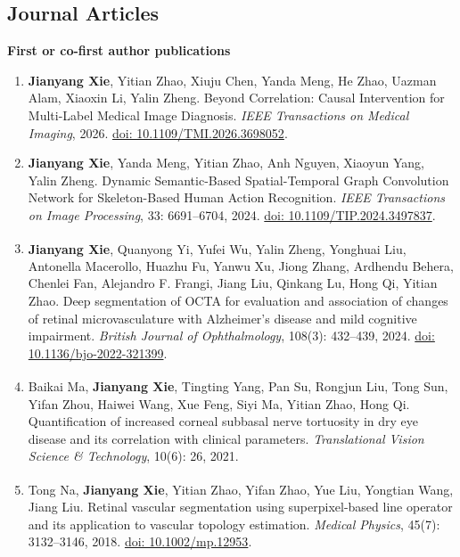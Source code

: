 \documentclass[11pt,a4paper]{article}
\begin{document}
\subsection*{Journal Articles}
\textbf{First or co-first author publications}\par
\begin{enumerate}[label={\textcolor{accent}{\sffamily\footnotesize J\arabic*}},leftmargin=2.5em,itemsep=8pt,parsep=0pt]
\item \textbf{Jianyang Xie}, Yitian Zhao, Xiuju Chen, Yanda Meng, He Zhao, Uazman Alam, Xiaoxin Li, Yalin Zheng. Beyond Correlation: Causal Intervention for Multi-Label Medical Image Diagnosis. \textit{IEEE Transactions on Medical Imaging}, 2026. \href{https://doi.org/10.1109/TMI.2026.3698052}{doi: 10.1109/TMI.2026.3698052}.
\item \textbf{Jianyang Xie}, Yanda Meng, Yitian Zhao, Anh Nguyen, Xiaoyun Yang, Yalin Zheng. Dynamic Semantic-Based Spatial-Temporal Graph Convolution Network for Skeleton-Based Human Action Recognition. \textit{IEEE Transactions on Image Processing}, 33: 6691--6704, 2024. \href{https://doi.org/10.1109/TIP.2024.3497837}{doi: 10.1109/TIP.2024.3497837}.
\item \textbf{Jianyang Xie}\textsuperscript{\dag}, Quanyong Yi\textsuperscript{\dag}, Yufei Wu\textsuperscript{\dag}, Yalin Zheng, Yonghuai Liu, Antonella Macerollo, Huazhu Fu, Yanwu Xu, Jiong Zhang, Ardhendu Behera, Chenlei Fan, Alejandro F. Frangi, Jiang Liu, Qinkang Lu, Hong Qi, Yitian Zhao. Deep segmentation of OCTA for evaluation and association of changes of retinal microvasculature with Alzheimer’s disease and mild cognitive impairment. \textit{British Journal of Ophthalmology}, 108(3): 432--439, 2024. \href{https://doi.org/10.1136/bjo-2022-321399}{doi: 10.1136/bjo-2022-321399}.
\item Baikai Ma\textsuperscript{\dag}, \textbf{Jianyang Xie}\textsuperscript{\dag}, Tingting Yang, Pan Su, Rongjun Liu, Tong Sun, Yifan Zhou, Haiwei Wang, Xue Feng, Siyi Ma, Yitian Zhao, Hong Qi. Quantification of increased corneal subbasal nerve tortuosity in dry eye disease and its correlation with clinical parameters. \textit{Translational Vision Science \& Technology}, 10(6): 26, 2021.
\item Tong Na\textsuperscript{\dag}, \textbf{Jianyang Xie}\textsuperscript{\dag}, Yitian Zhao, Yifan Zhao, Yue Liu, Yongtian Wang, Jiang Liu. Retinal vascular segmentation using superpixel-based line operator and its application to vascular topology estimation. \textit{Medical Physics}, 45(7): 3132--3146, 2018. \href{https://doi.org/10.1002/mp.12953}{doi: 10.1002/mp.12953}.
\end{enumerate}
\end{document}

